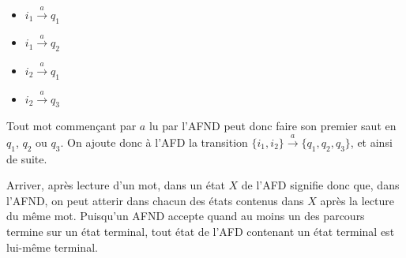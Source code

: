 \begin{itemize}
\item $i_1 \xrightarrow{a} q_1$
\item $i_1 \xrightarrow{a} q_2$
\item $i_2 \xrightarrow{a} q_1$
\item $i_2 \xrightarrow{a} q_3$
\end{itemize}

Tout mot commençant par $a$ lu par l'AFND peut donc faire son premier saut en $q_1$, $q_2$ ou $q_3$. On ajoute donc à l'AFD la transition $\{i_1,i_2\} \xrightarrow{a} \{q_1, q_2, q_3\}$, et ainsi de suite.

Arriver, après lecture d'un mot, dans un état $X$ de l'AFD signifie donc que, dans l'AFND, on peut atterir dans chacun des états contenus dans $X$ après la lecture du même mot. Puisqu'un AFND accepte quand au moins un des parcours termine sur un état terminal, tout état de l'AFD contenant un état terminal est lui-même terminal. 

